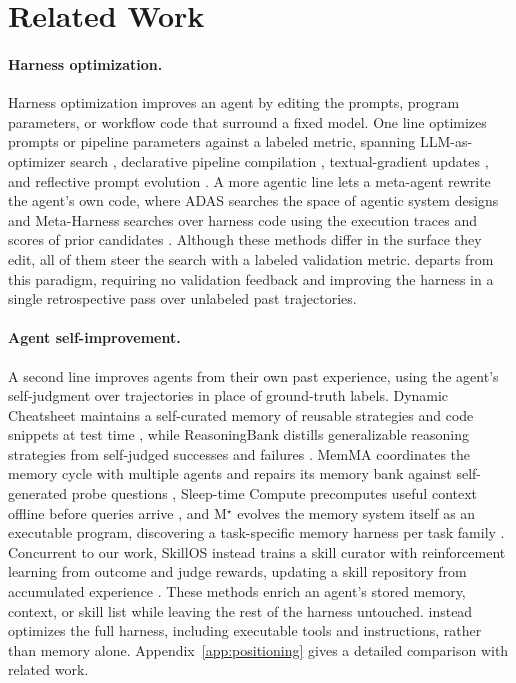 \section{Related Work}
\label{sec:related}

\paragraph{Harness optimization.}
Harness optimization improves an agent by editing the prompts, program parameters, or workflow code that surround a fixed model.
One line optimizes prompts or pipeline parameters against a labeled metric, spanning LLM-as-optimizer search \citep{yang2023opro}, declarative pipeline compilation \citep{khattab2023dspy}, textual-gradient updates \citep{yuksekgonul2024textgrad}, and reflective prompt evolution \citep{agrawal2025gepa}.
A more agentic line lets a meta-agent rewrite the agent's own code, where ADAS searches the space of agentic system designs \citep{hu2024adas} and Meta-Harness searches over harness code using the execution traces and scores of prior candidates \citep{lee2026metaharness}.
Although these methods differ in the surface they edit, all of them steer the search with a labeled validation metric.
\method{} departs from this paradigm, requiring no validation feedback and improving the harness in a single retrospective pass over unlabeled past trajectories.

\paragraph{Agent self-improvement.}
 A second line improves agents from their own past experience, using the agent's self-judgment over trajectories in place of ground-truth labels.
Dynamic Cheatsheet maintains a self-curated memory of reusable strategies and code snippets at test time \citep{suzgun2025dynamiccheatsheet}, while ReasoningBank distills generalizable reasoning strategies from self-judged successes and failures \citep{ouyang2026reasoningbank}.
MemMA coordinates the memory cycle with multiple agents and repairs its memory bank against self-generated probe questions \citep{lin2026memma}, Sleep-time Compute precomputes useful context offline before queries arrive \citep{lin2025sleeptime}, and M$^\star$ evolves the memory system itself as an executable program, discovering a task-specific memory harness per task family \citep{pan2026mstar}.
Concurrent to our work, SkillOS instead trains a skill curator with reinforcement learning from outcome and judge rewards, updating a skill repository from accumulated experience \citep{ouyang2026skillos}.
These methods enrich an agent's stored memory, context, or skill list while leaving the rest of the harness untouched.
\method{} instead optimizes the full harness, including executable tools and instructions, rather than memory alone.
Appendix~\ref{app:positioning} gives a detailed comparison with related work.

